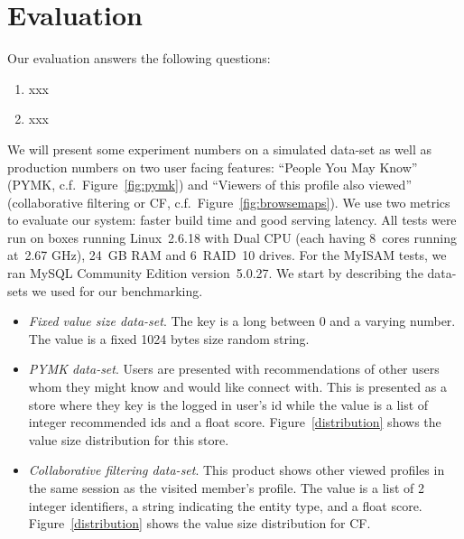 \section{Evaluation}
\label{sec:evaluation}

Our evaluation answers the following questions:
\begin{enumerate}
\item xxx
\item xxx
\end{enumerate}

We will present some experiment numbers on a simulated data-set as
well as production numbers on two user facing features: ``People You
May Know'' (PYMK, c.f.~Figure~\ref{fig:pymk}) and ``Viewers of this
profile also viewed'' (collaborative filtering or CF,
c.f.~Figure~\ref{fig:browsemaps}). We use two metrics to evaluate our
system: faster build time and good serving latency. All tests were run
on boxes running Linux~2.6.18 with Dual CPU (each having 8~cores
running at~2.67 GHz), 24~GB RAM and 6~RAID~10 drives. For the MyISAM
tests, we ran MySQL Community Edition version~5.0.27. We start by
describing the data-sets we used for our benchmarking. 

\begin{itemize}
\item \emph{Fixed value size data-set}. The key is a long between
0 and a varying number. The value is a fixed 1024 bytes size random
string. 
\item \emph{PYMK data-set}. Users are presented with recommendations
of other users whom they might know and would like connect with. This
is presented as a store where they key is the logged in user's id
while the value is a list of integer recommended ids and a float
score. Figure~\ref{distribution} shows the value size distribution for
this store. 
\item \emph{Collaborative filtering data-set}. This product shows
other viewed profiles in the same session as the visited member's
profile. The value is a list of 2 integer identifiers, a string
indicating the entity type, and a float score.
Figure~\ref{distribution} shows the value size distribution for CF. 
\end{itemize}

